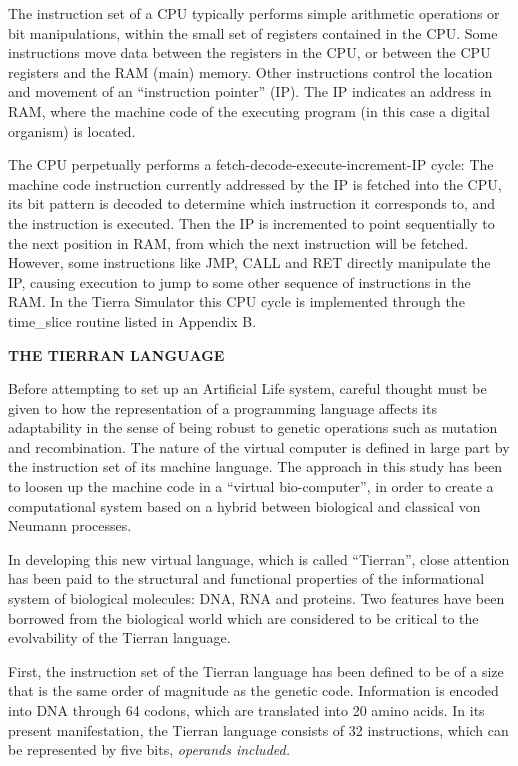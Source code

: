 The instruction set of a CPU typically performs simple arithmetic
operations or bit manipulations, within the small set of registers contained
in the CPU.  Some instructions move data between the registers in the CPU,
or between the CPU registers and the RAM (main) memory.  Other instructions
control the location and movement of an ``instruction pointer'' (IP).  The
IP indicates an address in RAM, where the machine code
of the executing program (in this case a digital organism) is located.

The CPU perpetually performs a fetch-decode-execute-increment-IP
cycle:  The machine code instruction currently addressed by the IP
is fetched into the CPU, its bit pattern is decoded to determine which
instruction it corresponds to, and the instruction is executed.  Then
the IP is incremented to point sequentially to the next position in RAM,
from which the next instruction will be fetched.  However, some instructions
like JMP, CALL and RET directly manipulate the IP, causing execution to
jump to some other sequence of instructions in the RAM.  In the Tierra
Simulator this CPU cycle is implemented through the time\_slice routine
listed in Appendix B.  

\LP
\bf THE TIERRAN LANGUAGE\rm
\eLP

Before attempting to set up an Artificial Life system, careful thought must
be given to how the representation of a programming language affects its
adaptability in the sense of being robust to genetic operations such as
mutation and recombination.  The nature of the virtual computer is defined
in large part by the instruction set of its machine language.  The approach
in this study has been to loosen up the machine code in a ``virtual
bio-computer'', in order to create a computational system based on a hybrid
between biological and classical von Neumann processes.

In developing this new virtual language, which is called ``Tierran'', close
attention has been paid to the structural and functional properties of the
informational system of biological molecules: DNA, RNA and proteins.  Two
features have been borrowed from the biological world which are considered
to be critical to the evolvability of the Tierran language.

First, the instruction set of the Tierran language has been defined to be
of a size that is the same order of magnitude as the genetic
code.  Information is encoded into DNA through 64 codons, which are
translated into 20 amino acids.  In its present manifestation, the Tierran
language consists of 32 instructions, which can be represented by five bits,
\it operands included\rm.


